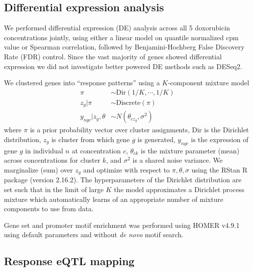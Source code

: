\documentclass{article}
\begin{document}
\subsection*{Differential expression analysis} 

We performed differential expression (DE) analysis across all 5 doxorubicin concentrations jointly, using either a linear model on quantile normalized cpm value or Spearman correlation, followed by Benjamini-Hochberg False Discovery Rate (FDR) control. Since the vast majority of genes showed differential expression we did not investigate better powered DE methods such as DESeq2. 

We clustered genes into ``response patterns'' using a $K$-component mixture model 
\begin{align}
\pi &\sim \text{Dir}(1/K,\cdots,1/K) \nonumber \\ 
z_g | \pi &\sim \text{Discrete}(\pi) \nonumber \\
y_{ngc} | z_g, \theta &\sim N( \theta_{cz_g}, \sigma^2 )
\label{eq:mixture}
\end{align}
where $\pi$ is a prior probability vector over cluster assignments, Dir is the Dirichlet distribution, $z_g$ is cluster from which gene $g$ is generated, $y_{ngc}$ is the expression of gene $g$ in individual $n$ at concentration $c$, $\theta_{ck}$ is the mixture parameter (mean) across concentrations for cluster $k$, and $\sigma^2$ is a shared noise variance. 
We marginalize (sum) over $z_g$ and optimize with respect to $\pi, \theta, \sigma$ using the RStan R package (version 2.16.2). 
The hyperparameters of the Dirichlet distribution are set such that in the limit of large $K$ the model approximates a Dirichlet process mixture \cite{maceachern1998estimating} which automatically learns of an appropriate number of mixture components to use from data. 

Gene set and promoter motif enrichment was performed using HOMER v4.9.1\cite{heinz2010simple} using default parameters and without \emph{de novo} motif search. 

\subsection*{Response eQTL mapping} 
\end{document}
